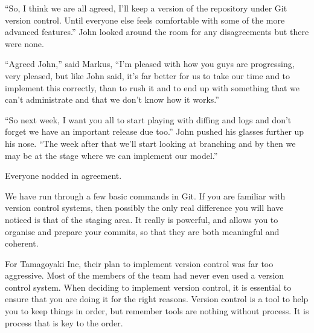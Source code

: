 \begin{trenches}
``So, I think we are all agreed, I'll keep a version of the repository under Git version control.  Until everyone else feels comfortable with some of the more advanced features.''  John looked around the room for any disagreements but there were none.

``Agreed John,'' said Markus, ``I'm pleased with how you guys are progressing, very pleased, but like John said, it's far better for us to take our time and to implement this correctly, than to rush it and to end up with something that we can't administrate and that we don't know how it works.''

``So next week, I want you all to start playing with diffing and logs and don't forget we have an important release due too.''  John pushed his glasses further up his nose.  ``The week after that we'll start looking at branching and by then we may be at the stage where we can implement our model.''

Everyone nodded in agreement.
\end{trenches}

We have run through a few basic commands in Git.  If you are familiar with version control systems, then possibly the only real difference you will have noticed is that of the staging area.  It really is powerful, and allows you to organise and prepare your commits, so that they are both meaningful and coherent.

For Tamagoyaki Inc, their plan to implement version control was far too aggressive.  Most of the members of the team had never even used a version control system.  When deciding to implement version control, it is essential to ensure that you are doing it for the right reasons.  Version control is a tool to help you to keep things in order, but remember tools are nothing without process.  It is process that is key to the order.

